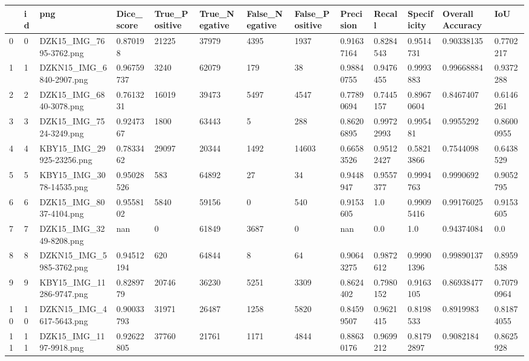 \documentclass[11pt, a4paper, twoside]{report}
\begin{document}
\begin{longtable}[c]{@{}lllllllllllll@{}}
\toprule
 & id & png & Dice\_score & True\_Positive & True\_Negative & False\_Negative & False\_Positive & Precision & Recall & Specificity & Overall Accuracy & IoU \\* \midrule
\endhead
%
\bottomrule
\endfoot
%
\endlastfoot
%
0 & 0 & DZK15\_IMG\_7695-3762.png & 0.870198 & 21225 & 37979 & 4395 & 1937 & 0.91637164 & 0.8284543 & 0.9514731 & 0.90338135 & 0.7702217 \\
1 & 1 & DZKN15\_IMG\_6840-2907.png & 0.96759737 & 3240 & 62079 & 179 & 38 & 0.98840755 & 0.9476455 & 0.9993883 & 0.99668884 & 0.9372288 \\
2 & 2 & DZK15\_IMG\_6840-3078.png & 0.7613231 & 16019 & 39473 & 5497 & 4547 & 0.77890694 & 0.7445157 & 0.89670604 & 0.8467407 & 0.6146261 \\
3 & 3 & DZK15\_IMG\_7524-3249.png & 0.9247367 & 1800 & 63443 & 5 & 288 & 0.86206895 & 0.99722993 & 0.995481 & 0.9955292 & 0.86000955 \\
4 & 4 & KBY15\_IMG\_29925-23256.png & 0.7833462 & 29097 & 20344 & 1492 & 14603 & 0.66583526 & 0.95122427 & 0.58213866 & 0.7544098 & 0.6438529 \\
5 & 5 & KBY15\_IMG\_3078-14535.png & 0.95028526 & 583 & 64892 & 27 & 34 & 0.9448947 & 0.9557377 & 0.9994763 & 0.9990692 & 0.9052795 \\
6 & 6 & DZK15\_IMG\_8037-4104.png & 0.9558102 & 5840 & 59156 & 0 & 540 & 0.9153605 & 1.0 & 0.99095416 & 0.99176025 & 0.9153605 \\
7 & 7 & DZK15\_IMG\_3249-8208.png & nan & 0 & 61849 & 3687 & 0 & nan & 0.0 & 1.0 & 0.94374084 & 0.0 \\
8 & 8 & DZKN15\_IMG\_5985-3762.png & 0.94512194 & 620 & 64844 & 8 & 64 & 0.90643275 & 0.9872612 & 0.99901396 & 0.99890137 & 0.8959538 \\
9 & 9 & KBY15\_IMG\_11286-9747.png & 0.8289779 & 20746 & 36230 & 5251 & 3309 & 0.8624402 & 0.7980152 & 0.9163105 & 0.86938477 & 0.70790964 \\
10 & 10 & DZKN15\_IMG\_4617-5643.png & 0.90033793 & 31971 & 26487 & 1258 & 5820 & 0.84599507 & 0.9621415 & 0.8198533 & 0.8919983 & 0.81874055 \\
11 & 11 & DZK15\_IMG\_1197-9918.png & 0.92622805 & 37760 & 21761 & 1171 & 4844 & 0.88630176 & 0.9699212 & 0.81792897 & 0.9082184 & 0.8625928 \\

\end{longtable}
\end{document}
